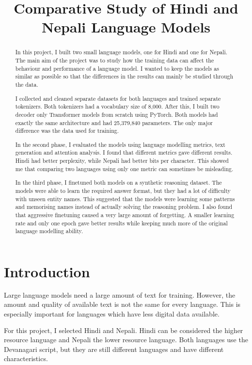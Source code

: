 \documentclass[twocolumn, 10pt]{article}
\title{Comparative Study of Hindi and Nepali Language Models}
\author{}
\date{}
\begin{document}
\maketitle

\begin{abstract}
In this project, I built two small language models, one for Hindi and one for Nepali. The main aim of the project was to study how the training data can affect the behaviour and performance of a language model. I wanted to keep the models as similar as possible so that the differences in the results can mainly be studied through the data.

I collected and cleaned separate datasets for both languages and trained separate tokenizers. Both tokenizers had a vocabulary size of 8,000. After this, I built two decoder only Transformer models from scratch using PyTorch. Both models had exactly the same architecture and had 25,379,840 parameters. The only major difference was the data used for training.

In the second phase, I evaluated the models using language modelling metrics, text generation and attention analysis. I found that different metrics gave different results. Hindi had better perplexity, while Nepali had better bits per character. This showed me that comparing two languages using only one metric can sometimes be misleading.

In the third phase, I finetuned both models on a synthetic reasoning dataset. The models were able to learn the required answer format, but they had a lot of difficulty with unseen entity names. This suggested that the models were learning some patterns and memorising names instead of actually solving the reasoning problem. I also found that aggressive finetuning caused a very large amount of forgetting. A smaller learning rate and only one epoch gave better results while keeping much more of the original language modelling ability.
\end{abstract}

\section{Introduction}
Large language models need a large amount of text for training. However, the amount and quality of available text is not the same for every language. This is especially important for languages which have less digital data available.

For this project, I selected Hindi and Nepali. Hindi can be considered the higher resource language and Nepali the lower resource language. Both languages use the Devanagari script, but they are still different languages and have different characteristics.
\end{document}
